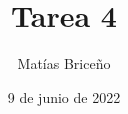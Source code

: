\documentclass[10pt,oneside]{article}
\author{Matías Briceño} %
\title{Tarea 4}
\date{9 de junio de 2022}
\begin{document}
\maketitle
\thispagestyle{fancy} %

\nocite{Wilks2006}
\nocite{Groot1992}


\printbibliography
\end{document}
